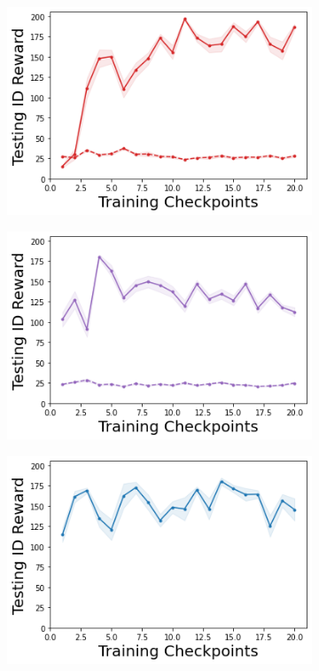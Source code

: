 \begin{figure}
    \begin{subfigure}{.24\textwidth}
        \includegraphics[width=\textwidth]{sections/011_icml2022/resources/DropOut-CartPole-v0-mean_reward_-testing-strategy.png}
    \end{subfigure}
    \begin{subfigure}{.24\textwidth}
        \includegraphics[width=\textwidth]{sections/011_icml2022/resources/Ensemble-CartPole-v0-mean_reward_-testing-strategy.png}
    \end{subfigure}
    \begin{subfigure}{.24\textwidth}
        \includegraphics[width=\textwidth]{sections/011_icml2022/resources/DKL-CartPole-v0-mean_reward_-testing-strategy.png}

\end{subfigure}
\end{figure}
